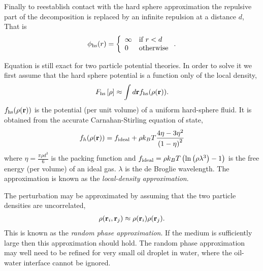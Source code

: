 Finally to reestablish contact with the hard sphere approximation 
the repulsive part of the decomposition is replaced by an infinite repulsion at a distance $d$,
That is 
\begin{align}
  \phi_{\text{hs}}(r) = \left\{
    \begin{array}{ll}
      \infty & \text{if $r<d$}\\
      0 & \text{otherwise}
    \end{array} \right. .
\end{align}

Equation  is still exact for two particle potential theories.
In order to solve it we first  assume that the  hard sphere potential is a function only of the local density,
\begin{align}
  F_{\text{hs}} \left[ \rho \right] \approx \int d\textbf{r} f_{\text{hs}}(\rho(\textbf{r})). \label{eqn:LDA}
\end{align}
$f_{\text{hs}}(\rho(\textbf{r}))$ is the potential (per unit volume) of a uniform  hard-sphere fluid\cite{Evans1992}.
It is obtained from the accurate  Carnahan-Stirling equation of state,
\begin{align}
    f_h(\rho(\textbf{r})) =  f_{\text{ideal}} + \rho k_B T\frac{4\eta - 3\eta^2}{\left( 1-\eta \right)^2}
  \label{eqn:nuc:CS}
\end{align}
where $\eta =  \frac{\pi \rho d^3}{6}$ is the packing function and $f_{\text{ideal}} =  \rho k_B T\left( \ln \left( \rho \lambda^3 \right) -1 \right)$ is the free energy (per volume) of an ideal gas.
$\lambda$ is the de Broglie wavelength.
%
The approximation  is known as the {\em local-density approximation}.

The perturbation may be approximated by assuming that the two particle densities are uncorrelated, 
\begin{align}
\rho(\textbf{r}_i, \textbf{r}_j) \approx \rho(\textbf{r}_i)\rho(\textbf{r}_j).\label{eqn:RPA}
\end{align}
This is known as the {\em random phase approximation}.
If the medium is sufficiently large then this approximation should hold\cite{Evans1992}.
The random phase approximation may well need to be refined for very small oil droplet in water,  
where the oil-water interface cannot be ignored.

